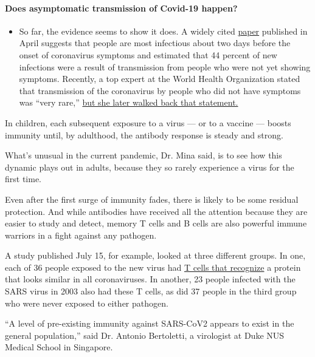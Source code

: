 \begin{itemize}
{  \paragraph{Does asymptomatic transmission of Covid-19
  happen?}\label{does-asymptomatic-transmission-of-covid-19-happen}}

  \begin{itemize}
  \tightlist
  \item
    So far, the evidence seems to show it does. A widely cited
    \href{https://www.nature.com/articles/s41591-020-0869-5}{paper}
    published in April suggests that people are most infectious about
    two days before the onset of coronavirus symptoms and estimated that
    44 percent of new infections were a result of transmission from
    people who were not yet showing symptoms. Recently, a top expert at
    the World Health Organization stated that transmission of the
    coronavirus by people who did not have symptoms was ``very rare,''
    \href{https://www.nytimes3xbfgragh.onion/2020/06/09/world/coronavirus-updates.html?action=click\&pgtype=Article\&state=default\&region=MAIN_CONTENT_3\&context=storylines_faq\#link-1f302e21}{but
    she later walked back that statement.}
  \end{itemize}
\end{itemize}

In children, each subsequent exposure to a virus --- or to a vaccine ---
boosts immunity until, by adulthood, the antibody response is steady and
strong.

What's unusual in the current pandemic, Dr. Mina said, is to see how
this dynamic plays out in adults, because they so rarely experience a
virus for the first time.

Even after the first surge of immunity fades, there is likely to be some
residual protection. And while antibodies have received all the
attention because they are easier to study and detect, memory T cells
and B cells are also powerful immune warriors in a fight against any
pathogen.

A study published July 15, for example, looked at three different
groups. In one, each of 36 people exposed to the new virus had
\href{https://www.nature.com/articles/s41586-020-2550-z}{T cells that
recognize} a protein that looks similar in all coronaviruses. In
another, 23 people infected with the SARS virus in 2003 also had these T
cells, as did 37 people in the third group who were never exposed to
either pathogen.

``A level of pre-existing immunity against SARS-CoV2 appears to exist in
the general population,'' said Dr. Antonio Bertoletti, a virologist at
Duke NUS Medical School in Singapore.

